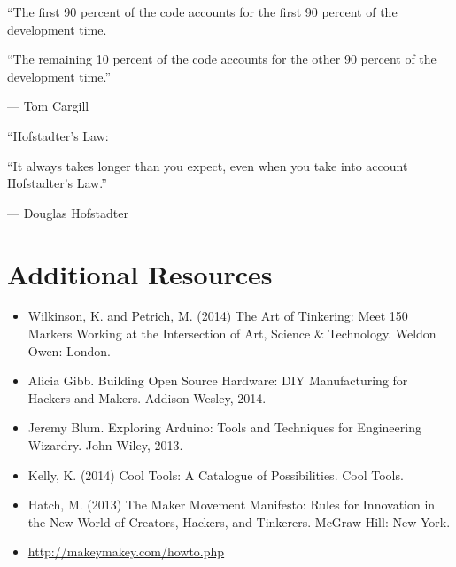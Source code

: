 \documentclass{../fal_assignment}
\begin{document}
\begin{marginquote}
    ``The first 90 percent of the code accounts for the first 90 percent of the development time.
    
    ``The remaining 10 percent of the code accounts for the other 90 percent of the development time.''
    
    --- Tom Cargill
    
    \marginquoterule
    
    ``Hofstadter's Law:
    
    ``It always takes longer than you expect, even when you take into account Hofstadter's Law.''
    
    --- Douglas Hofstadter
\end{marginquote}
\section*{Additional Resources}

\begin{itemize}
    \item Wilkinson, K. and Petrich, M. (2014) The Art of Tinkering: Meet 150 Markers Working at the Intersection of Art, Science \& Technology. Weldon Owen: London.
    \item Alicia Gibb. Building Open Source Hardware: DIY Manufacturing for Hackers and Makers. Addison Wesley, 2014. 
    \item Jeremy Blum. Exploring Arduino: Tools and Techniques for Engineering Wizardry. John Wiley, 2013. 
    \item Kelly, K. (2014) Cool Tools: A Catalogue of Possibilities. Cool Tools.
    \item Hatch, M. (2013) The Maker Movement Manifesto: Rules for Innovation in the New World of Creators, Hackers, and Tinkerers. McGraw Hill: New York.
    \item \url{http://makeymakey.com/howto.php}
\end{itemize}
\end{document}
